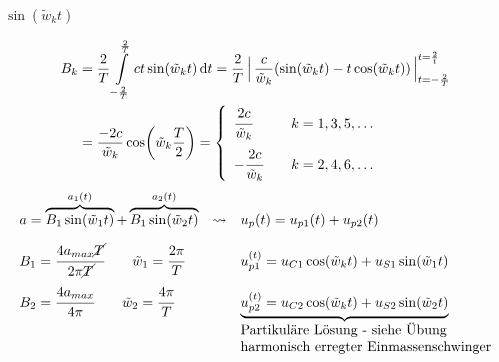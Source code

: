 \documentclass[12pt]{exam}
\begin{document}
\begin{questions}
\begin{solution}
\begin{minipage}[t]{.49\linewidth}
    $\sin(\tilde{w}_k t)$\\
    
    \end{minipage}
 \vspace{1em}
 
    \begin{align*}
     B_k &= \frac{2}{T} \int\limits_{-\frac{2}{T}}^{\frac{2}{T}} ct \sin(\tilde{w}_k t) \dd{t} = \frac{2}{T}\,\Big|\, \frac{c}{\tilde{w}_k}(\sin(\tilde{w}_k t)-t\cos(\tilde{w}_k t))\,\Big|_{t={-\frac{2}{T}}}^{t=\frac{2}{t}} \\
     &= \frac{-2c}{\tilde{w}_k} \cos(\tilde{w}_k\frac{T}{2}) = 
     \left\{
     \begin{array}{lll}
     \cfrac{2c}{\tilde{w}_k} & &k = 1,3,5,\dots\\[1em]
     -\cfrac{2c}{\tilde{w}_k} & &k = 2,4,6,\dots 
     \end{array}\right.
\end{align*}
\begin{align*}
     \begin{array}{lcl}
        a = \overbrace{B_1\sin(\tilde{w}_1 t)}^{a_1(t)} + \overbrace{B_1\sin(\tilde{w}_2 t)}^{a_2(t)} & \rightsquigarrow & u_p(t) = u_{p1}(t) + u_{p2}(t) \\[1em]
        B_1 = \cfrac{4a_{max}\cancel{T}}{2\pi\cancel{T}} \qquad \tilde{w}_1 = \cfrac{2\pi}{T} && u_{p1}^{(t)} = u_{C1} \cos(\tilde{w}_k t) + u_{S1} \sin(\tilde{w}_1 t) \\[1em]
        B_2 = \cfrac{4a_{max}}{4\pi} \qquad \tilde{w}_2 = \cfrac{4\pi}{T}&& \underbrace{u_{p2}^{(t)} = u_{C2} \cos(\tilde{w}_k t) + u_{S2} \sin(\tilde{w}_2 t)} \\
        &&\text{Partikuläre Lösung - siehe Übung}\\
        &&\text{harmonisch erregter Einmassenschwinger}
        \end{array}
\end{align*}\\[2em]
 

\end{solution}
\end{questions}
\end{document}
